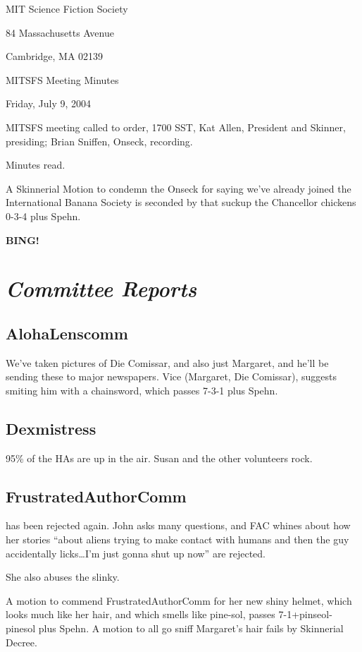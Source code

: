 \documentclass[10pt]{article}
\newcommand{\bing}{{\bf BING!} }
\newcommand{\goto}[1]{\bing \vskip 12pt \section*{{\em{#1}}}}
\newcommand{\ps}{ plus Spehn\xspace}
\begin{document}
\begin{center}

MIT Science Fiction Society 

84 Massachusetts Avenue

Cambridge, MA 02139

\vspace{12pt}

MITSFS Meeting Minutes 

Friday, July 9, 2004

\end{center}
 
\vspace{18pt}

\setlength{\parskip}{6pt}

\noindent
MITSFS meeting called to order, 1700 SST, Kat Allen, President and
Skinner, presiding; Brian Sniffen,  Onseck, recording.

Minutes read.

A Skinnerial Motion to condemn the Onseck for saying we've already
joined the International Banana Society is seconded by that suckup the
Chancellor chickens 0-3-4\ps.

\goto{Committee Reports}
\subsection*{AlohaLenscomm}
We've taken pictures of Die Comissar, and also just Margaret, and
he'll be sending these to major newspapers.  Vice (Margaret, Die
Comissar), suggests smiting him with a chainsword, which passes
7-3-1\ps.

\subsection*{Dexmistress}
95\% of the HAs are up in the air.  Susan and the other volunteers rock.

\subsection*{FrustratedAuthorComm}
has been rejected again.  John asks many questions, and FAC whines
about how her stories ``about aliens trying to make contact with humans
and then the guy accidentally licks\dots I'm just gonna shut up now''
are rejected.

She also abuses the slinky.

A motion to commend FrustratedAuthorComm for her new shiny helmet,
which looks much like her hair, and  which smells like pine-sol, passes
7-1+pinseol-pinesol\ps.  A motion to all go sniff Margaret's hair
fails by Skinnerial Decree.
\end{document}
